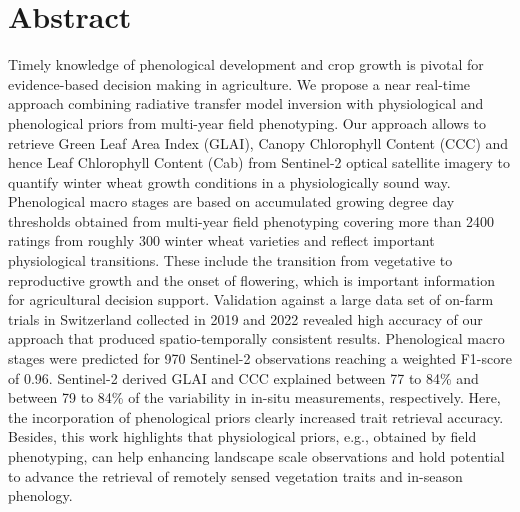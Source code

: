 \section*{Abstract}
Timely knowledge of phenological development and crop growth is pivotal for evidence-based decision making in agriculture. We propose a near real-time approach combining radiative transfer model inversion with physiological and phenological priors from multi-year field phenotyping. Our approach allows to retrieve Green Leaf Area Index (GLAI), Canopy Chlorophyll Content (CCC) and hence Leaf Chlorophyll Content (Cab) from Sentinel-2 optical satellite imagery to quantify winter wheat growth conditions in a physiologically sound way. Phenological macro stages are based on accumulated growing degree day thresholds obtained from multi-year field phenotyping covering more than 2400 ratings from roughly 300 winter wheat varieties and reflect important physiological transitions. These include the transition from vegetative to reproductive growth and the onset of flowering, which is important information for agricultural decision support. Validation against a large data set of on-farm trials in Switzerland collected in 2019 and 2022 revealed high accuracy of our approach that produced spatio-temporally consistent results. Phenological macro stages were predicted for 970 Sentinel-2 observations reaching a weighted F1-score of 0.96. Sentinel-2 derived \gls{GLAI} and \gls{CCC} explained between 77 to 84\% and between 79 to 84\% of the variability in in-situ measurements, respectively. Here, the incorporation of phenological priors clearly increased trait retrieval accuracy. Besides, this work highlights that physiological priors, e.g., obtained by field phenotyping, can help enhancing landscape scale observations and hold potential to advance the retrieval of remotely sensed vegetation traits and in-season phenology.


